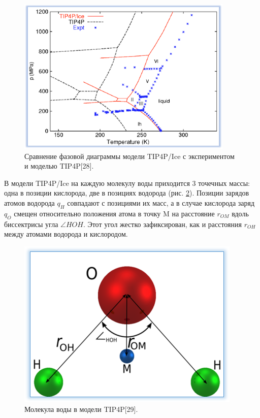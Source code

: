 \begin{figure}[H]
    \centering
    \includegraphics[width=.65\linewidth]{figures/tip4pdiag.png}
    \caption{Сравнение фазовой диаграммы модели TIP4P/Ice с экспериментом и моделью TIP4P[28].}
    \label{fig2.6.2}
\end{figure}

В модели TIP4P/Ice на каждую молекулу воды приходится 3 точечных массы: одна в позиции кислорода, две в позициях водорода (рис. \ref{fig2.6.3}). Позиции зарядов атомов водорода $q_H$ совпадают с позициями их масс, а в случае кислорода заряд $q_O$ смещен относительно положения атома в точку M на расстояние $r_{OM}$ вдоль биссектрисы угла $\angle HOH$. Этот угол жестко зафиксирован, как и расстояния $r_{OH}$ между атомами водорода и кислородом.

\begin{figure}[H]
    \centering
    \includegraphics[width=.6\linewidth]{figures/water_mol.png}
    \caption{Молекула воды в модели TIP4P[29].}
    \label{fig2.6.3}
\end{figure}

